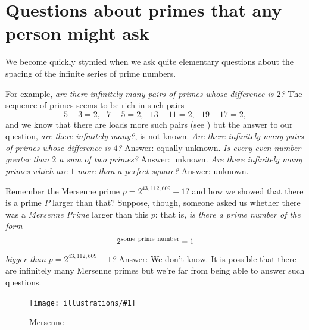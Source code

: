\documentclass[openany]{book}
\newcommand{\ill}[3]{%
   \begin{figure}[H]%
   \vspace{-2ex}
   \centering%
   \texttt{[image: illustrations/\#1]}%
   \caption{#3}%
   \vspace{-2ex}
    \end{figure}}
\theoremstyle{plain}
\theoremstyle{definition}
\begin{document}
%

%


\chapter[Questions about primes]{Questions about primes that any person might ask}

We become quickly stymied when we ask quite elementary questions about
the spacing of the infinite series of prime numbers.

For example, {\em are there infinitely many pairs of primes whose
  difference is $2$?}  The sequence of primes seems to be rich in such
pairs $$5-3 =2,\ \ \ 7-5=2,\ \ \ 13-11=2,\ \ \ 19-17 =2,$$ and we know
that there are loads more such pairs (see ) but the answer to our question,
{\em are there infinitely many?}, is not known. {\em Are there
  infinitely many pairs of primes whose difference is $4$?}  Answer:
equally unknown. {\em Is every even number greater than $2$ a sum of
  two primes?}  Answer: unknown. {\em Are there infinitely many primes
  which are $1$ more than a perfect square?}  Answer: unknown.




Remember the Mersenne prime $p= 2^{43,112,609}-1$? and how we showed
that there is a prime $P$ larger than that? Suppose, though, someone
asked us whether there was a {\it Mersenne Prime} larger than this
$p$: that is, {\em is there a prime number of the form $$2^{\rm some\
  prime\ number}-1$$ bigger than $p= 2^{43,112,609}-1$?} Answer:  We don't
know. It is possible that there are infinitely many Mersenne primes
but we're far from being able to answer such questions.

\ill{mersenne}{.3}{Mersenne}
\end{document}
